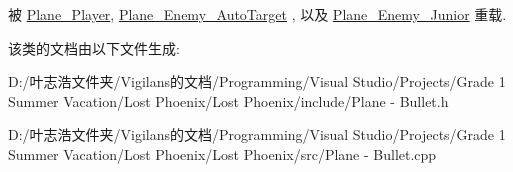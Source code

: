 被 \hyperlink{class_plane___player_ae68c08ce11fad9fd164c00eb4db6b348}{Plane\+\_\+\+Player}, \hyperlink{class_plane___enemy___auto_target_a79e6eda540d282205ce6151ae0b304ca}{Plane\+\_\+\+Enemy\+\_\+\+Auto\+Target} , 以及 \hyperlink{class_plane___enemy___junior_a262143737ed740f65063dbcbc5970f55}{Plane\+\_\+\+Enemy\+\_\+\+Junior} 重载.



该类的文档由以下文件生成\+:\begin{DoxyCompactItemize}
\item 
D\+:/叶志浩文件夹/\+Vigilans的文档/\+Programming/\+Visual Studio/\+Projects/\+Grade 1 Summer Vacation/\+Lost Phoenix/\+Lost Phoenix/include/Plane -\/ Bullet.\+h\item 
D\+:/叶志浩文件夹/\+Vigilans的文档/\+Programming/\+Visual Studio/\+Projects/\+Grade 1 Summer Vacation/\+Lost Phoenix/\+Lost Phoenix/src/Plane -\/ Bullet.\+cpp\end{DoxyCompactItemize}
